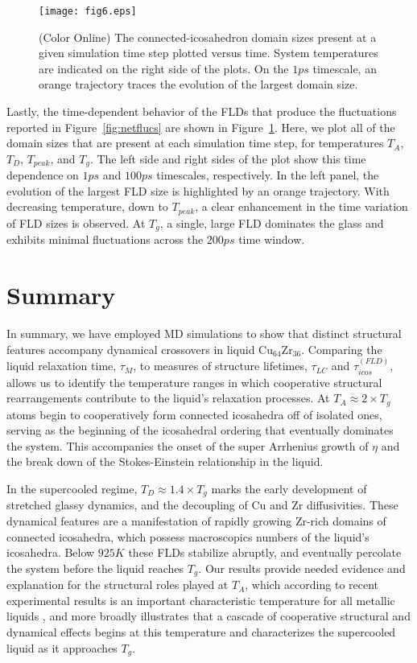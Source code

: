 \documentclass[aps,prl,preprint,showpacs,amsmath,floatfix,superscriptaddress]{revtex4}
\begin{document}
\begin{figure}[t]
\texttt{[image: fig6.eps]}
\caption{(Color Online) The connected-icosahedron domain sizes
present at a given simulation time step plotted versus time.
System temperatures are indicated on the right side of the plots.
On the $1ps$ timescale, an orange trajectory traces the evolution
of the largest domain size.} \label{fig:timeflucs}
\end{figure}

Lastly, the time-dependent behavior of the FLDs that produce the
fluctuations reported in Figure~\ref{fig:netflucs} are shown in
Figure~\ref{fig:timeflucs}. Here, we plot all of the domain sizes
that are present at each simulation time step, for temperatures
$T_{A}$, $T_{D}$, $T_{peak}$, and $T_{g}$. The left side and right
sides of the plot show this time dependence on $1ps$ and $100ps$
timescales, respectively. In the left panel, the evolution of the
largest FLD size is highlighted by an orange trajectory. With
decreasing temperature, down to $T_{peak}$, a clear enhancement in
the time variation of FLD sizes is observed. At $T_{g}$, a single,
large FLD dominates the glass and exhibits minimal fluctuations
across the $200ps$ time window.

\section{Summary}

In summary, we have employed MD simulations to show that distinct
structural features accompany dynamical crossovers in liquid
$\mathrm{Cu_{64}Zr_{36}}$. Comparing the liquid relaxation time,
$\tau_{M}$, to measures of structure lifetimes, $\tau_{LC}$ and
$\tau^{(FLD)}_{icos}$, allows us to identify the temperature
ranges in which cooperative structural rearrangements contribute
to the liquid's relaxation processes. At $T_{A} \approx 2\times
T_{g}$  atoms begin to cooperatively form connected icosahedra off
of isolated ones, serving as the beginning of the icosahedral
ordering that eventually dominates the system. This accompanies
the onset of the super Arrhenius growth of $\eta$ and the break
down of the Stokes-Einstein relationship in the liquid.

In the supercooled regime, $T_{D}\approx 1.4 \times T_{g}$ marks
the early development of stretched glassy dynamics, and the
decoupling of Cu and Zr diffusivities. These dynamical features are a
manifestation of rapidly growing Zr-rich domains of connected
icosahedra, which possess macroscopics numbers of the liquid's
icosahedra. Below $925K$ these FLDs stabilize abruptly, and
eventually percolate the system before the liquid reaches $T_{g}$.
Our results provide needed evidence and explanation for the
structural roles played at $T_{A}$, which according to recent
experimental results is an important characteristic temperature
for all metallic liquids \cite{Kelton2014}, and more broadly
illustrates that a cascade of cooperative structural and dynamical
effects begins at this temperature and characterizes the
supercooled liquid as it approaches $T_{g}$.
\end{document}
